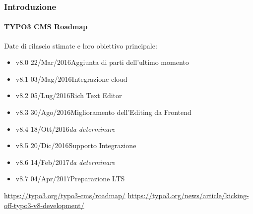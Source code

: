 \begin{frame}[fragile]
	\frametitle{Introduzione}
	\framesubtitle{TYPO3 CMS Roadmap}

	Date di rilascio stimate e loro obiettivo principale:

	\begin{itemize}

		\item
			\begingroup
				\color{typo3orange}
					v8.0 \tabto{1.1cm}22/Mar/2016\tabto{3.4cm}Aggiunta di parti dell'ultimo momento
			\endgroup
		\item v8.1 \tabto{1.1cm}03/Mag/2016\tabto{3.4cm}Integrazione cloud
		\item v8.2 \tabto{1.1cm}05/Lug/2016\tabto{3.4cm}Rich Text Editor
		\item v8.3 \tabto{1.1cm}30/Ago/2016\tabto{3.4cm}Miglioramento dell'Editing da Frontend
		\item v8.4 \tabto{1.1cm}18/Ott/2016\tabto{3.4cm}\textit{da determinare}
		\item v8.5 \tabto{1.1cm}20/Dic/2016\tabto{3.4cm}Supporto Integrazione
		\item v8.6 \tabto{1.1cm}14/Feb/2017\tabto{3.4cm}\textit{da determinare}
		\item v8.7 \tabto{1.1cm}04/Apr/2017\tabto{3.4cm}Preparazione LTS

	\end{itemize}

	\smaller
		\url{https://typo3.org/typo3-cms/roadmap/}\newline
		\url{https://typo3.org/news/article/kicking-off-typo3-v8-development/}
	\normalsize

\end{frame}

